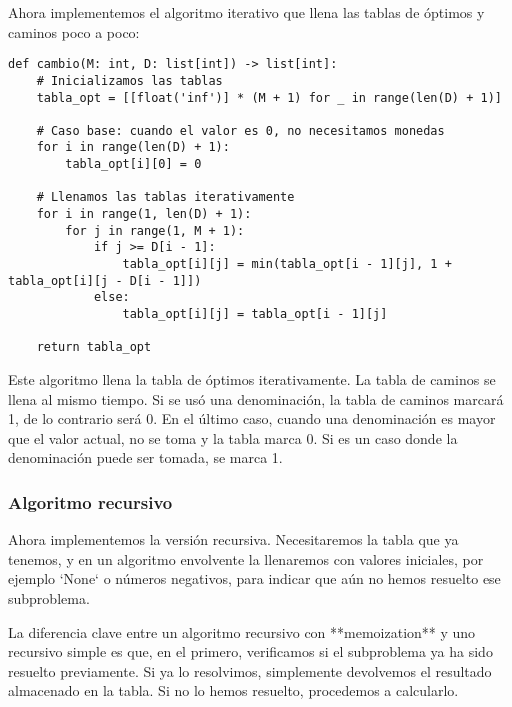 \documentclass[tikz,11pt,fleqn]{book} %
\begin{document}

Ahora implementemos el algoritmo iterativo que llena las tablas de óptimos y caminos poco a poco:

\begin{lstlisting}
def cambio(M: int, D: list[int]) -> list[int]:
    # Inicializamos las tablas
    tabla_opt = [[float('inf')] * (M + 1) for _ in range(len(D) + 1)]

    # Caso base: cuando el valor es 0, no necesitamos monedas
    for i in range(len(D) + 1):
        tabla_opt[i][0] = 0

    # Llenamos las tablas iterativamente
    for i in range(1, len(D) + 1):
        for j in range(1, M + 1):
            if j >= D[i - 1]:
                tabla_opt[i][j] = min(tabla_opt[i - 1][j], 1 + tabla_opt[i][j - D[i - 1]])
            else:
                tabla_opt[i][j] = tabla_opt[i - 1][j]

    return tabla_opt
\end{lstlisting}

Este algoritmo llena la tabla de óptimos iterativamente. La tabla de caminos se llena al mismo tiempo. Si se usó una denominación, la tabla de caminos marcará 1, de lo contrario será 0. En el último caso, cuando una denominación es mayor que el valor actual, no se toma y la tabla marca 0. Si es un caso donde la denominación puede ser tomada, se marca 1.

\subsubsection{Algoritmo recursivo}

Ahora implementemos la versión recursiva. Necesitaremos la tabla que ya tenemos, y en un algoritmo envolvente la llenaremos con valores iniciales, por ejemplo `None` o números negativos, para indicar que aún no hemos resuelto ese subproblema.

La diferencia clave entre un algoritmo recursivo con **memoization** y uno recursivo simple es que, en el primero, verificamos si el subproblema ya ha sido resuelto previamente. Si ya lo resolvimos, simplemente devolvemos el resultado almacenado en la tabla. Si no lo hemos resuelto, procedemos a calcularlo.
\end{document}
